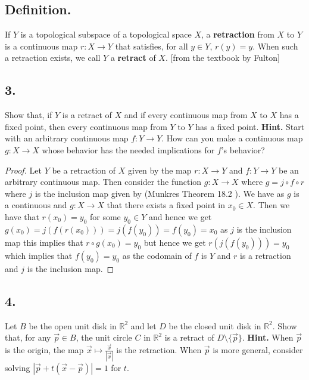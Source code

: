 \documentclass{amsart}
\theoremstyle{plain}
\theoremstyle{definition}
\theoremstyle{remark}
\begin{document}
\vspace{.15in}
\subsection*{Definition.}  If $Y$ is a topological subspace of a topological space $X$, a {\bf retraction} from $X$ to $Y$ is a continuous map $r : X \to Y$ that satisfies, for all $y\in Y$, $r(y) = y$. When such a retraction exists, we call $Y$ a {\bf retract} of $X$. [from the textbook by Fulton]

\vspace{.15in}
\noindent
\subsection*{3.} Show that, if $Y$ is a retract of $X$ and if every continuous map from $X$ to $X$ has a fixed point, then every continuous map from $Y$ to $Y$ has a fixed point. {\bf Hint.} Start with an arbitrary continuous map $f : Y\to Y$. How can you make a continuous map $g : X\to X$ whose behavior has the needed implications for $f$'s behavior?

\begin{proof}
    Let $Y$ be a retraction of $X$ given by the map $r:X\to Y$ and $f:Y\to Y$ be an arbitrary continuous map. Then consider the function $g:X\to X$ where $g=j\circ f\circ r$ where $j$ is the inclusion map given by (Munkres Theorem 18.2 ). We have as $g$ is a continuous and $g:X \to X$ that there exists a fixed point in $x_0 \in X$. Then we have that $r(x_0)=y_0$ for some $y_0\in Y$ and hence we get $g(x_0)=j(f(r(x_0)))=j(f(y_0))=f(y_0)=x_0$ as $j$ is the inclusion map this implies that $r \circ g(x_0)=y_0$ but hence we get $r(j(f(y_0)))=y_0$ which implies that $f(y_0)=y_0$ as the codomain of $f$ is $Y$ and $r$ is a retraction and $j$ is the inclusion map.

    
\end{proof}
 


\vspace{.15in}
\noindent
\subsection*{4.} Let $B$ be the open unit disk in $\mathbb R ^2$ and let $D$ be the closed unit disk in $\mathbb R ^2$. Show that, for any $\vec{p} \in B$, the unit circle $C$ in $\mathbb R ^2$ is a retract of $D\setminus \{ \vec{p}\}$. {\bf Hint.} When $\vec{p}$ is the origin, the map $\vec{x} \mapsto \frac{\vec{x}}{|\vec{x}|}$ is the retraction. When $\vec{p}$ is more general, consider solving $|\vec{p} + t(\vec{x}-\vec{p})| = 1$ for $t$. 
\end{document}
